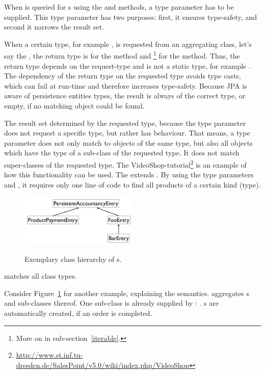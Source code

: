 When  is queried for s using the  and  methods, a type parameter has to be supplied.
This type parameter has two purposes: first, it ensures type-safety, and second it narrows the result set.

When a certain type, for example , is requested from an aggregating class, let's say the , the return type is  for the  method and \footnote{More on  in sub-section~\ref{iterable}.} for the  method.
Thus, the return type depends on the request-type and is not a static type, for example .
The dependency of the return type on the requested type avoids type casts, which can fail at run-time and therefore increases type-safety.
Because JPA is aware of persistence entities types, the result is always of the correct type, or empty, if no matching object could be found.

The result set determined by the requested type, because the type parameter does not request a specific type, but rather has  behaviour.
That means, a type parameter does not only match to objects of the same type, but also all objects which have the type of a sub-class of the requested type.
It does not match super-classes of the requested type.
The VideoShop-tutorial\footnote{\url{http://www.st.inf.tu-dresden.de/SalesPoint/v5.0/wiki/index.php/VideoShop}} is an example of how this functionality can be used.
The  extends .
By using the type parameters  and , it requires only one line of code to find all products of a certain kind (type).

\begin{figure}
	\centering
  \includegraphics[width=0.5\textwidth]{images/type_matches.pdf}
	\label{matches}
	\caption{Exemplary class hierarchy of s.}
\end{figure}
 matches all class types.

Consider Figure~\ref{matches} for another example, explaining the  semantics.
 aggregates s and sub-classes thereof.
One sub-class is already supplied by \salespoint{}: .
s are automatically created, if an order is completed.

